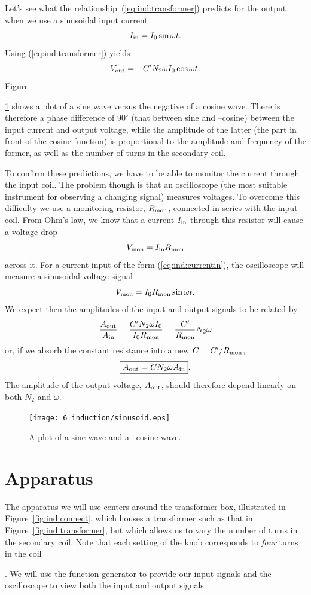 Let's see what the relationship~(\ref{eq:ind:transformer}) predicts for the 
output when we use a sinusoidal input current
\begin{equation}
I_{\rm{in}} = I_0 \sin\omega t. \label{eq:ind:currentin}
\end{equation}
Using (\ref{eq:ind:transformer}) yields
\begin{equation}
V_{\rm{out}}= -C' N_2 \omega I_0 \cos\omega t. \label{eq:ind:voltageout}
\end{equation}
Figure~{\ref{fig:ind:sinusoid} shows a plot of a sine wave versus the negative
of a cosine wave.
There is therefore a phase difference of $90^\circ$ (that between sine and 
--cosine) between the input current and output voltage, while the amplitude
of the latter (the part in front of the cosine function) is proportional to
the amplitude and frequency of the former, as well as the number of turns in
the secondary coil.

To confirm these predictions, we have to be able to monitor the current
through the input coil. The problem though is that an oscilloscope (the most
suitable instrument for observing a changing signal) measures voltages. To
overcome this difficulty we use a monitoring resistor, $R_{\rm{mon}}$,
connected in series with the input coil. From Ohm's law, we know that a current
$I_{\rm{in}}$ through this resistor will cause a voltage drop
$$
V_{\rm{mon}}=I_{\rm{in}}R_{\rm{mon}}
$$
across it. For a current input of the form (\ref{eq:ind:currentin}), the
oscilloscope will measure a sinusoidal voltage signal
$$
V_{\rm{mon}} = I_0 R_{\rm{mon}} \sin \omega t.
$$
We expect then the amplitudes of the input and output signals to be related by
$$
\frac{A_{\rm{out}}}{A_{\rm{in}}} = \frac{C' N_2 \omega I_0}
{I_0 R_{\rm{mon}}} = \frac{C'}{R_{\rm{mon}}} N_2 \omega
$$
or, if we absorb the constant resistance into a new $C=C'/R_{\rm{mon}}$,
\begin{equation}
\fbox{$ \displaystyle  A_{\rm{out}} = C N_2 \omega A_{\rm{in}}$}.
\end{equation}
The amplitude of the output voltage, $A_{\rm{out}}$, should therefore depend
linearly on both $N_2$ and $\omega$.
\begin{figure}[htb]
\centering 
\epsfxsize=10cm \texttt{[image: 6\_induction/sinusoid.eps]}
\caption{A plot of a sine wave and a --cosine wave.}
\label{fig:ind:sinusoid}
\end{figure}

\section{Apparatus}

The apparatus we will use centers around the transformer box, illustrated in
Figure~\ref{fig:ind:connect}, which houses a transformer such as that in 
Figure~\ref{fig:ind:transformer}, but which allows us to vary the number of 
turns in the secondary coil. 
Note that each setting of the knob corresponds to
{\it four} turns in the coil}. We will use the function generator to provide 
our input signals and the oscilloscope to view both the input and output 
signals.


